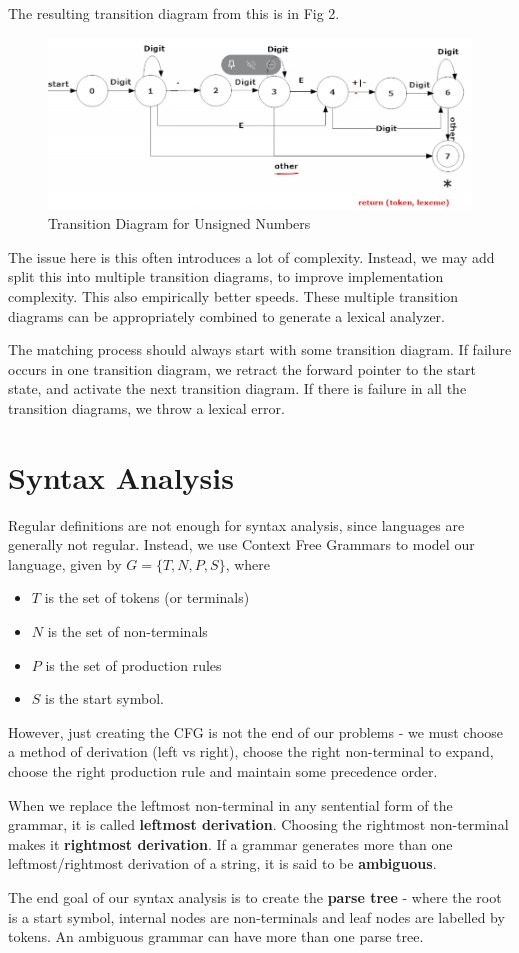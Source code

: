 \documentclass[12pt,letterpaper]{article}
\begin{document}
The resulting transition diagram from this is in Fig 2.

\begin{figure}[htpb]
  \centering
  \includegraphics[width=0.8\linewidth]{./assets/unsigned_num_trans_diag.png}
  \caption{Transition Diagram for Unsigned Numbers}%
  \label{fig:}
\end{figure}

The issue here is this often introduces a lot of complexity. Instead, we may add split this into multiple transition diagrams, to improve implementation complexity. This also empirically better speeds. These multiple transition diagrams can be appropriately combined to generate a lexical analyzer.

The matching process should always start with some transition diagram. If failure occurs in one transition diagram, we retract the forward pointer to the start state, and activate the next transition diagram. If there is failure in all the transition diagrams, we throw a lexical error.

\section{Syntax Analysis}

Regular definitions are not enough for syntax analysis, since languages are generally not regular. Instead, we use Context Free Grammars to model our language, given by $G = \{T,N,P,S\}$, where

\begin{itemize}
  \item $T$ is the set of tokens (or terminals)
  \item $N$ is the set of non-terminals
  \item $P$ is the set of production rules
  \item $S$ is the start symbol.
\end{itemize}

However, just creating the CFG is not the end of our problems - we must choose a method of derivation (left vs right), choose the right non-terminal to expand, choose the right production rule and maintain some precedence order.

When we replace the leftmost non-terminal in any sentential form of the grammar, it is called \textbf{leftmost derivation}. Choosing the rightmost non-terminal makes it \textbf{rightmost derivation}. If a grammar generates more than one leftmost/rightmost derivation of a string, it is said to be \textbf{ambiguous}.

The end goal of our syntax analysis is to create the \textbf{parse tree} - where the root is a start symbol, internal nodes are non-terminals and leaf nodes are labelled by tokens. An ambiguous grammar can have more than one parse tree.
\end{document}

